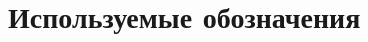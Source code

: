 \documentclass[../main.tex]{subfiles}
\begin{document}
	\section*{Используемые обозначения}
	
	
	 
	\pagebreak
\end{document}
